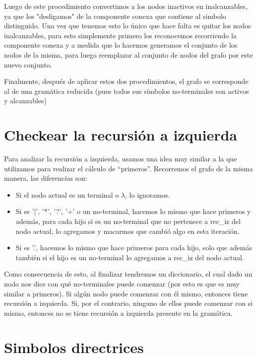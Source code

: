 \documentclass[a4paper]{report}
\begin{document}
	Luego de este procedimiento convertimos a los nodos inactivos en inalcanzables, 
ya que los "desligamos" de la componente conexa que contiene al simbolo distinguido. Una vez 
que tenemos esto lo único que hace falta es quitar los nodos inalcanzables, para esto simplemente 
primero los reconocemos recorriendo la componente conexa y a medida que lo hacemos generamos 
el conjunto de los nodos de la misma, para luego reemplazar al conjunto de nodos del grafo 
por este nuevo conjunto.


	Finalmente, después de aplicar estos dos procedimientos, el grafo se
corresponde al de una gramática reducida (pues todos sus símbolos no-terminales son
activos y alcanzables)


\section*{Checkear la recursión a izquierda}

	Para analizar la recursión a izquierda, usamos una idea muy similar a la que
utilizamos para realizar el cálculo de "`primeros"'. Recorremos el grafo de la misma manera, las
diferencias son:


\begin{itemize}

\item Si el nodo actual es un terminal o $\lambda$, lo ignoramos.

\item Si es '|', '*', '?', '+' o un no-terminal, hacemos lo mismo que hace primeros y además, para cada hijo si es un no-terminal que no pertenece a rec\_iz del nodo actual, lo agregamos y macarmos que cambió algo en
esta iteración.

\item Si es '.', hacemos lo mismo que hace primeros para cada hijo, solo que además también si el hijo es un no-terminal lo agregamos a rec\_iz del
nodo actual.

\end{itemize}


	Como consecuencia de esto, al finalizar tendremos un diccionario, el cual dado un nodo nos
dice con qué no-terminales puede comenzar (por esto es que es muy similar a
primeros). Si algún nodo puede comenzar con él mismo, entonces tiene recursión a
izquierda. Si, por el contrario, ninguno de ellos puede comenzar con si mismo, entonces no se tiene
recursión a izquierda presente en la gramática.


\section*{Simbolos directrices}
\end{document}
